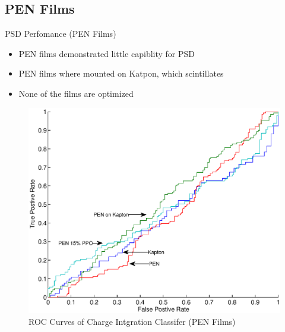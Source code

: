 \subsection{PEN Films}
\begin{frame}{PSD Perfomance (PEN Films)}
\small
\begin{itemize}
	\item PEN films demonstrated little capiblity for PSD
	\item PEN films where mounted on Katpon, which scintillates
	\item None of the films are optimized \cite{zaitseva_plastic_2012}
\end{itemize}
	\begin{figure}
		\centering
		\includegraphics[height=0.55\textheight]{images/PEN_ROC_Comparison.eps}
		\caption{ROC Curves of Charge Intgration Classifer (PEN Films)}
	\end{figure}
\end{frame}
